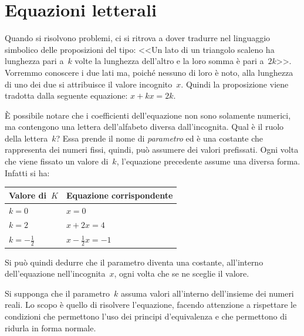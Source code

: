 \section{Equazioni letterali}
\label{sec:compl1_eqletterali}
Quando si risolvono problemi, ci si ritrova a dover tradurre nel 
linguaggio simbolico delle proposizioni del tipo:
<<Un lato di un triangolo scaleno ha lunghezza pari a~\(k\) volte la 
lunghezza dell'altro e la loro somma è pari a~\(2k\)>>.
Vorremmo conoscere i due lati ma, poiché nessuno di loro è noto, alla 
lunghezza di uno dei due si attribuisce il valore incognito~\(x\). 
Quindi la proposizione viene tradotta dalla seguente equazione:
\(x+kx=2k\).

È possibile notare che i coefficienti dell'equazione non sono solamente 
numerici, ma contengono una lettera dell'alfabeto diversa
dall'incognita. Qual è il ruolo della lettera~\(k\)?
Essa prende il nome di \emph{parametro} ed è una costante che 
rappresenta dei numeri fissi, quindi, può assumere dei valori 
prefissati.
Ogni volta che viene fissato un valore di~\(k\), l'equazione precedente 
assume una diversa forma. Infatti si ha:
\begin{center}
\begin{tabular}{ll}
\toprule
Valore di~\(K\) & Equazione corrispondente\\
\midrule
\(k=0\) & \(x=0\)\\
\(k=2\) & \(x+2x=4\)\\
\(k=-\frac{1}{2}\) & \(x-\frac{1}{2}x=-1\)\\
\bottomrule
\end{tabular}
\end{center}
Si può quindi dedurre che il parametro diventa una costante, all'interno 
dell'equazione nell'incognita~\(x\), ogni volta che se ne sceglie il 
valore.

Si supponga che il parametro~\(k\) assuma valori all'interno 
dell'insieme dei 
numeri reali. Lo scopo è quello di risolvere l'equazione,
facendo attenzione a rispettare le condizioni che permettono l'uso dei 
principi d'equivalenza e che permettono di ridurla in forma normale.

